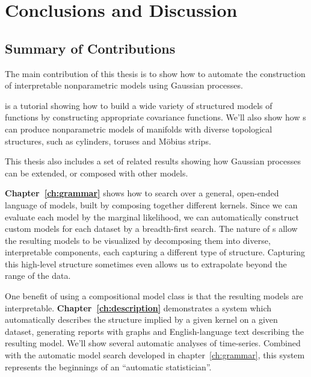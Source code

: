 
\inbpdocument

\chapter{Conclusions and Discussion}
\label{ch:discussion}


\section{Summary of Contributions}

The main contribution of this thesis is to show how to automate the construction of interpretable nonparametric models using Gaussian processes.

 is a tutorial showing how to build a wide variety of structured models of functions by constructing appropriate covariance functions.
We'll also show how \gp{}s can produce nonparametric models of manifolds with diverse topological structures, such as cylinders, toruses and M\"obius strips.



This thesis also includes a set of related results showing how Gaussian processes can be extended, or composed with other models.


{\bf Chapter~\ref{ch:grammar}} shows how to search over a general, open-ended language of models, built by composing together different kernels.
Since we can evaluate each model by the marginal likelihood, we can automatically construct custom models for each dataset by a breadth-first search.
The nature of \gp{}s allow the resulting models to be visualized by decomposing them into diverse, interpretable components, each capturing a different type of structure.
Capturing this high-level structure sometimes even allows us to extrapolate beyond the range of the data.

One benefit of using a compositional model class is that the resulting models are interpretable.
{\bf Chapter~\ref{ch:description}} demonstrates a system which automatically describes the structure implied by a given kernel on a given dataset, generating reports with graphs and English-language text describing the resulting model.
We'll show several automatic analyses of time-series.
Combined with the automatic model search developed in chapter~\ref{ch:grammar}, this system represents the beginnings of an ``automatic statistician''.


